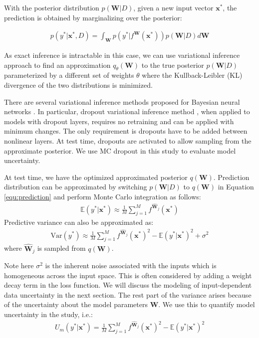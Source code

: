 \documentclass[letterpaper]{article} %
\newcommand{\vect}[1]{\mathbf{#1}}
\newcommand{\matr}[1]{\mathbf{#1}}
\newcommand{\vx}[0]{\vect{x}}
\newcommand{\E}{\mathbb{E}}
\newcommand{\mW}[0]{\matr{W}}
\newcommand{\william}[1]{\textcolor{blue}{[William: #1]}}
\begin{document}
With the posterior distribution $p(\mW|D)$, given a new input vector $\vx^*$, the prediction is obtained by marginalizing over the posterior:

\begin{align}
\label{equ:prediction}
p(y^*|\vx^*,D)=\int_\mW{p\left(y^*|f^\mW(\vx^*)\right)p(\mW|D)d\mW}
\end{align}

As exact inference is intractable in this case, we can use variational inference approach to find an approximation $q_\theta(\mW)$ to the true posterior $p(\mW|D)$ parameterized by a different set of weights $\theta$ where the Kullback-Leibler (KL) divergence of the two distributions is minimized.

There are several variational inference methods proposed for Bayesian neural networks \cite{hernandez2015probabilistic,blundell2015weight,gal2016dropout}. In particular, dropout variational inference method \cite{gal2016dropout}, when applied to models with dropout layers, requires no retraining and can be applied with minimum changes. The only requirement is dropouts have to be added between nonlinear layers. At test time, dropouts are activated to allow sampling from the approximate posterior. We use MC dropout in this study to evaluate model uncertainty.



At test time, we have the optimized approximated posterior $q(\mW)$. Prediction distribution can be approximated by switching $p(\mW|D)$ to $q(\mW)$ in Equation \ref{equ:prediction} and perform Monte Carlo integration as follows:
\begin{align}
\E(y^*|\vx^*)\approx\frac{1}{M}\sum_{j=1}^Mf^{\widehat{\mW}_j}(\vx^*)
\end{align}
Predictive variance can also be approximated as:
\begin{align}
\label{equ:var1}
\text{Var}\left(y^*\right)\approx \frac{1}{M}\sum_{j=1}^Mf^{\widehat{\mW}_j}(\vx^*)^2-\E(y^*|\vx^*)^2 +\sigma^2
\end{align}
where $\widehat{\mW}_j$ is sampled from $q(\mW)$.

Note here $\sigma^2$ is the inherent noise associated with the inputs which is homogeneous across the input space. This is often considered by adding a weight decay term in the loss function. We will discuss the modeling of input-dependent data uncertainty in the next section. The rest part of the variance arises because of the uncertainty about the model parameters $\mW$. We use this to quantify model uncertainty in the study, i.e.:
\begin{align}
U_m(y^*|\vx^*)=\frac{1}{M}\sum_{j=1}^Mf^{\widehat{\mW}_j}(\vx^*)^2-\E(y^*|\vx^*)^2
\end{align}
\end{document}
